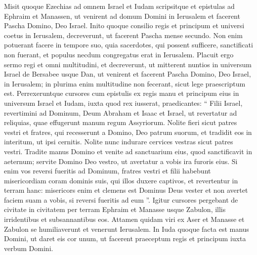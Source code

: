 \begin{biblechapter}
\begin{biblechapter}
\begin{biblechapter}
\begin{biblechapter}
\begin{biblechapter}
\begin{biblechapter}
\begin{biblechapter}
\begin{biblechapter}
\begin{biblechapter}
\begin{biblechapter}
\begin{biblechapter}
\begin{biblechapter}
\begin{biblechapter}
\begin{biblechapter}
\begin{biblechapter}
\begin{biblechapter}
\begin{biblechapter}
\begin{biblechapter}
\begin{biblechapter}
\begin{biblechapter}
\begin{biblechapter}
\begin{biblechapter}
\begin{biblechapter}
\begin{biblechapter}
\begin{biblechapter}
\begin{biblechapter}
\begin{biblechapter}
\begin{biblechapter}
\begin{biblechapter}
\begin{biblechapter}
\verse Misit quoque Ezechias ad omnem Israel et Iudam scripsitque et epistulas ad Ephraim et Manassen, ut venirent ad domum Domini in Ierusalem et facerent Pascha Domino, Deo Israel. 
\verse Inito quoque consilio regis et principum et universi coetus in Ierusalem, decreverunt, ut facerent Pascha mense secundo. 
 \verse Non enim potuerant facere in tempore suo, quia sacerdotes, qui possent sufficere, sanctificati non fuerant, et populus necdum congregatus erat in Ierusalem. 
\verse Placuit ergo sermo regi et omni multitudini, 
\verse et decreverunt, ut mitterent nuntios in universum Israel de Bersabee usque Dan, ut venirent et facerent Pascha Domino, Deo Israel, in Ierusalem; in plurima enim multitudine non fecerant, sicut lege praescriptum est.
 \verse Perrexeruntque cursores cum epistulis ex regis manu et principum eius in universum Israel et Iudam, iuxta quod rex iusserat, praedicantes: “ Filii Israel, revertimini ad Dominum, Deum Abraham et Isaac et Israel, ut revertatur ad reliquias, quae effugerunt manum regum Assyriorum. 
\verse Nolite fieri sicut patres vestri et fratres, qui recesserunt a Domino, Deo patrum suorum, et tradidit eos in interitum, ut ipsi cernitis. 
\verse Nolite nunc indurare cervices vestras sicut patres vestri. Tradite manus Domino et venite ad sanctuarium eius, quod sanctificavit in aeternum; servite Domino Deo vestro, ut avertatur a vobis ira furoris eius. 
\verse Si enim vos reversi fueritis ad Dominum, fratres vestri et filii habebunt misericordiam coram dominis suis, qui illos duxere captivos, et revertentur in terram hanc: misericors enim et clemens est Dominus Deus vester et non avertet faciem suam a vobis, si reversi fueritis ad eum ”.
 \verse Igitur cursores pergebant de civitate in civitatem per terram Ephraim et Manasse usque Zabulon, illis irridentibus et subsannantibus eos. 
\verse Attamen quidam viri ex Aser et Manasse et Zabulon se humiliaverunt et venerunt Ierusalem. 
\verse In Iuda quoque facta est manus Domini, ut daret eis cor unum, ut facerent praeceptum regis et principum iuxta verbum Domini.

\end{biblechapter}
\end{biblechapter}
\end{biblechapter}
\end{biblechapter}
\end{biblechapter}
\end{biblechapter}
\end{biblechapter}
\end{biblechapter}
\end{biblechapter}
\end{biblechapter}
\end{biblechapter}
\end{biblechapter}
\end{biblechapter}
\end{biblechapter}
\end{biblechapter}
\end{biblechapter}
\end{biblechapter}
\end{biblechapter}
\end{biblechapter}
\end{biblechapter}
\end{biblechapter}
\end{biblechapter}
\end{biblechapter}
\end{biblechapter}
\end{biblechapter}
\end{biblechapter}
\end{biblechapter}
\end{biblechapter}
\end{biblechapter}
\end{biblechapter}
